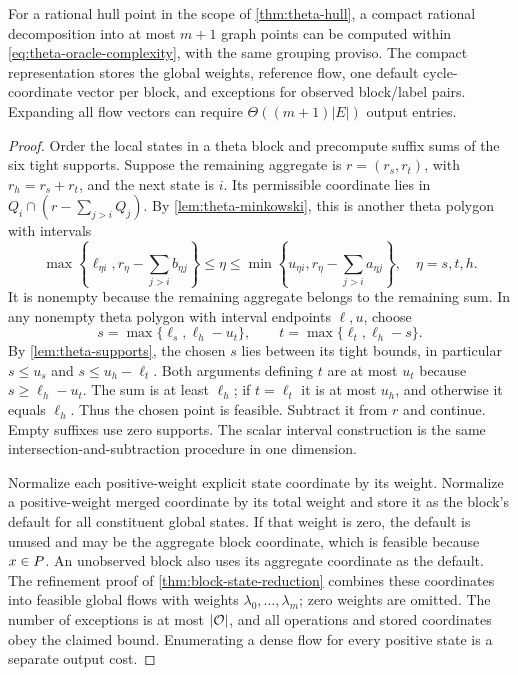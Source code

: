 \begin{proposition}\label{prop:theta-recovery}
For a rational hull point in the scope of \cref{thm:theta-hull}, a compact
rational decomposition into at most $m+1$ graph points can be computed
within \eqref{eq:theta-oracle-complexity}, with the same grouping proviso.
The compact representation stores the global weights, reference flow,
one default cycle-coordinate vector per block, and exceptions for observed block/label
pairs. Expanding all flow vectors can require $\Theta((m+1)|E|)$ output
entries.
\end{proposition}
\begin{proof}
Order the local states in a theta block and precompute suffix sums of
the six tight supports. Suppose the remaining aggregate is $r=(r_s,r_t)$,
with $r_h=r_s+r_t$, and the next state is $i$. Its permissible coordinate
lies in $Q_i\cap(r-\sum_{j>i}Q_j)$. By
\cref{lem:theta-minkowski}, this is another theta polygon with intervals
\begin{equation}\label{eq:theta-recovery-intersection}
 \max\left\{\ell_{\eta i},r_\eta-\sum_{j>i}b_{\eta j}\right\}
 \le\eta\le
 \min\left\{u_{\eta i},r_\eta-\sum_{j>i}a_{\eta j}\right\},
 \quad\eta=s,t,h.
\end{equation}
It is nonempty because the remaining aggregate belongs to the remaining
sum. In any nonempty theta polygon with interval endpoints $\ell,u$,
choose
\begin{equation}\label{eq:theta-point-choice}
 s=\max\{\ell_s,\ell_h-u_t\},\qquad
 t=\max\{\ell_t,\ell_h-s\}.
\end{equation}
By \cref{lem:theta-supports}, the chosen $s$ lies between its tight
bounds, in particular $s\le u_s$ and $s\le u_h-\ell_t$. Both
arguments defining $t$ are at most $u_t$ because
$s\ge\ell_h-u_t$. The sum is at least $\ell_h$; if $t=\ell_t$ it
is at most $u_h$, and otherwise it equals $\ell_h$. Thus the chosen
point is feasible. Subtract it from $r$ and continue. Empty suffixes
use zero supports. The scalar interval construction is the same
intersection-and-subtraction procedure in one dimension.

Normalize each positive-weight explicit state coordinate by its weight.
Normalize a positive-weight merged coordinate by its total weight and
store it as the block's default for all constituent global states.
If that weight is zero, the default is unused and may be the aggregate
block coordinate, which is feasible because $x\in P$. An unobserved
block also uses its aggregate coordinate as the default. The refinement
proof of \cref{thm:block-state-reduction} combines these coordinates into
feasible global flows with weights $\lambda_0,\ldots,\lambda_m$; zero
weights are omitted. The number of exceptions is at most $|\mathcal O|$,
and all operations and stored coordinates obey the claimed bound.
Enumerating a dense flow for every positive state is a separate output cost.
\end{proof}

